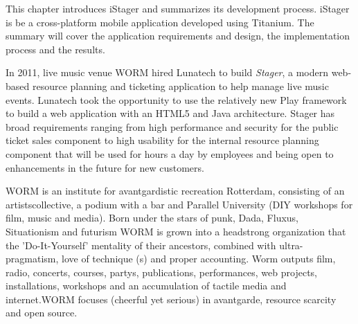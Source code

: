 This chapter introduces iStager and summarizes its development process. iStager is be a cross-platform mobile application developed using Titanium. The summary will cover the application requirements and design, the implementation process and the results. 






In 2011, live music venue WORM hired Lunatech to build \emph{Stager}, a modern web-based resource planning and ticketing application to help manage live music events. Lunatech took the opportunity to use the relatively new Play framework to build a web application with an HTML5 and Java architecture. Stager has broad requirements ranging from high performance and security for the public ticket sales component to high usability for the internal resource planning component that will be used for hours a day by employees and being open to enhancements in the future for new customers. \cite{Lunatech2011}

WORM is an institute for avantgardistic recreation Rotterdam, consisting of an artistscollective, a podium with a bar and Parallel University (DIY workshops for film, music and media). Born under the stars of punk, Dada, Fluxus, Situationism and futurism WORM is grown into a headstrong organization that the 'Do-It-Yourself' mentality of their ancestors, combined with ultra-pragmatism, love of technique (s) and proper accounting. Worm outputs film, radio, concerts, courses, partys, publications, performances, web projects, installations, workshops and an accumulation of tactile media and internet.WORM focuses (cheerful yet serious) in avantgarde, resource scarcity and open source. \cite{WORM2012}

